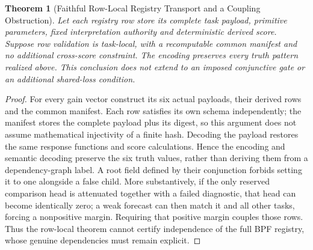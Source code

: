 \documentclass[11pt,a4paper]{article}
\newtheorem{theorem}{Theorem}[section]
\theoremstyle{definition}
\begin{document}
\begin{theorem}[Faithful Row-Local Registry Transport and a Coupling Obstruction]
\label{thm:registry-independence}
Let each registry row store its complete task payload, primitive parameters,
fixed interpretation authority and deterministic derived score. Suppose row
validation is task-local, with a recomputable common manifest and no additional
cross-score constraint. The encoding preserves every truth pattern realized
above. This conclusion does not extend to an imposed conjunctive gate or
an additional shared-loss condition.
\end{theorem}
\begin{proof}
For every gain vector construct its six actual payloads, their derived rows
and the common manifest. Each row satisfies its own schema independently;
the manifest stores the complete payload plus its digest, so this argument
does not assume mathematical injectivity of a finite hash. Decoding the
payload restores the same response functions and score calculations. Hence
the encoding and semantic decoding preserve the six truth values, rather
than deriving them from a dependency-graph label. A root field defined by
their conjunction forbids setting it to one alongside a false child. More
substantively, if the only reserved comparison head is attenuated together
with a failed diagnostic, that head can become identically zero; a weak
forecast can then match it and all other tasks, forcing a nonpositive
margin. Requiring that positive margin couples those rows. Thus the
row-local theorem cannot certify independence of the full BPF registry,
whose genuine dependencies must remain explicit.
\end{proof}
\end{document}
